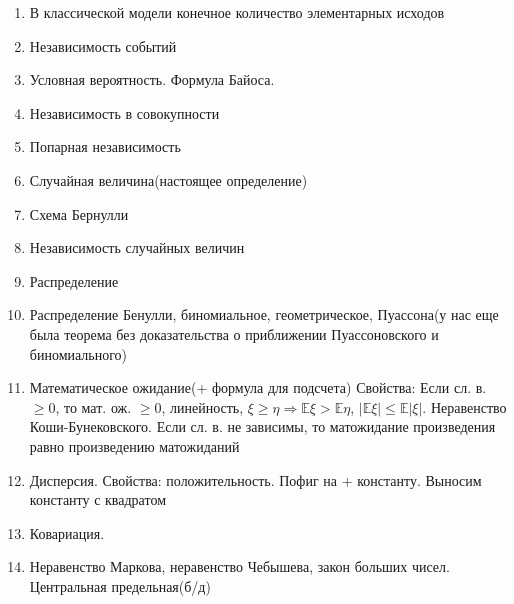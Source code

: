 \documentclass[a4paper, 12pt]{article}
\begin{document}
  \begin{enumerate}
    \item В классической модели конечное количество элементарных исходов
    \item Независимость событий
    \item Условная вероятность. Формула Байоса.
    \item Независимость в совокупности
    \item Попарная независимость
    \item Случайная величина(настоящее определение)
    \item Схема Бернулли
    \item Независимость случайных величин
    \item Распределение
    \item Распределение Бенулли, биномиальное, геометрическое, Пуассона(у нас еще была теорема без доказательства о приближении Пуассоновского и биномиального)
    \item Математическое ожидание(+ формула для подсчета) Свойства: Если сл. в. $\geqslant 0$, то мат. ож. $\geqslant 0$, линейность, $\xi \geqslant  \eta \Rightarrow \mathbb{E} \xi > \mathbb{E} \eta$, $|\mathbb{E} \xi| \leqslant \mathbb{E} |\xi|$. {Неравенство Коши-Бунековского.} Если сл. в. не зависимы, то матожидание произведения равно произведению матожиданий
    \item Дисперсия. Свойства: положительность. Пофиг на + константу. Выносим константу с квадратом
    \item Ковариация.
    \item Неравенство Маркова, неравенство Чебышева, закон больших чисел. Центральная предельная(б/д)


  \end{enumerate}
\end{document}
